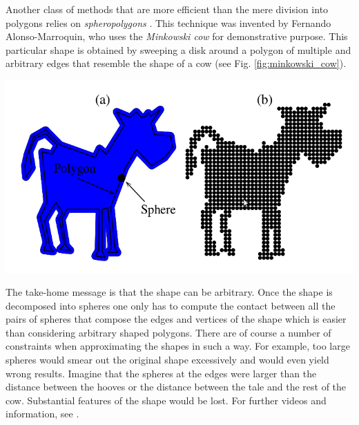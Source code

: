 

\vspace{0.2cm}
\noindent
\begin{minipage}{\textwidth}
\begin{minipage}{0.38\textwidth}
Another class of methods that are more efficient than the mere division into polygons  relies on \emph{spheropolygons} \citep{spheropolygons}. This technique was invented by Fernando Alonso-Marroquin, who uses the \emph{Minkowski cow} for demonstrative purpose. This particular shape is obtained by sweeping a disk around a polygon of multiple and arbitrary edges that resemble the shape of a cow (see Fig. \ref{fig:minkowski_cow}).
\end{minipage}
\hfill
\begin{minipage}{.58\textwidth}
  \centering
  \includegraphics[width=.75\textwidth]{pics/minkowski_cow.jpeg}
  \label{fig:minkowski_cow}
\end{minipage}
\end{minipage}
\vspace{0.1cm}

The take-home message is that the shape can be arbitrary. Once the shape is decomposed into spheres one only has to compute the contact between all the pairs of spheres that compose the edges and vertices of the shape which is easier than considering arbitrary shaped polygons.  There are of course a number of constraints when approximating the shapes in such a way. For example, too large spheres would smear out the original shape excessively and would even yield wrong results. Imagine that the spheres at the edges were larger than the distance between the hooves or the distance between the tale and the rest of the cow. Substantial features of the shape would be lost. For further videos and information, see \cite{spheropolygons2}.


